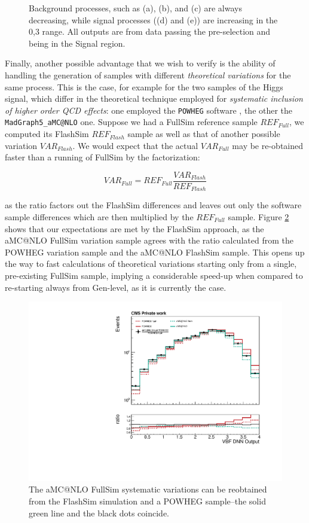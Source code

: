\begin{figure}
    \caption[Angular distributions]{Background processes, such as (a), (b), and (c) are always decreasing, while signal processes ((d) and (e)) are increasing in the 0,3 range. All outputs are from data passing the pre-selection and being in the Signal region. }\label{fig:DNNout}
\end{figure}

Finally, another possible advantage that we wish to verify is the ability of handling the generation of samples with different \emph{theoretical variations} for the same process. This is the case, for example for the two samples of the Higgs signal, which differ in the theoretical technique employed for \emph{systematic inclusion of higher order QCD effects}: one employed the \texttt{POWHEG} software \cite{Nason_2004}, the other the \texttt{MadGraph5\_aMC@NLO} \cite{powpow} one. Suppose we had a FullSim reference sample $REF_{Full}$, we computed its FlashSim $REF_{Flash}$ sample as well as that of another possible variation $VAR_{Flash}$. We would expect that the actual $VAR_{Full}$ may be re-obtained faster than a running of FullSim by the factorization:

\[VAR_{Full} = REF_{Full} \frac{VAR_{Flash}}{REF_{Flash}}
\]

as the ratio factors out the FlashSim differences and leaves out only the software sample differences which are then multiplied by the $REF_{Full}$ sample. Figure \ref{fig:sysvar} shows that our expectations are met by the FlashSim approach, as the aMC@NLO FullSim variation sample agrees with the ratio calculated from the POWHEG variation sample and the aMC@NLO FlashSim sample. This opens up the way to fast calculations of theoretical variations starting only from a single, pre-existing FullSim sample, implying a considerable speed-up when compared to re-starting always from Gen-level, as it is currently the case.

\begin{figure}
    \centering
    \includegraphics[width=\linewidth]{gfx/ch6/systematic_production.pdf}
    \caption[Systematic production]{The aMC@NLO FullSim systematic variations can be reobtained from the FlashSim simulation and a POWHEG sample--the solid green line and the black dots coincide.}
    \label{fig:sysvar}
\end{figure}

